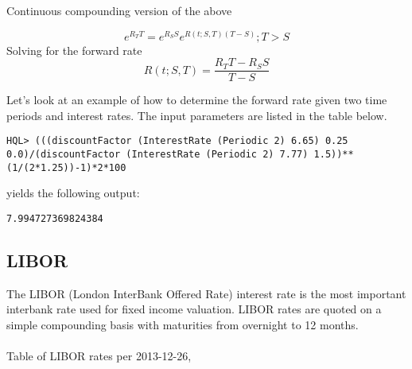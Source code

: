 \documentclass[11pt,a4paper]{article}
\numberwithin{equation}{section}
\begin{document}
Continuous compounding version of the above

\[
e^{R_TT}=e^{R_SS}e^{R(t;S,T)(T-S)};T>S
\]
Solving for the forward rate
\[
R(t;S,T)=\frac{R_TT-R_SS}{T-S}
\]

Let's look at an example of how to determine the forward rate given two time periods and interest rates. The input parameters are listed in the table below.


\FrameSep
\begin{lstlisting}
HQL> (((discountFactor (InterestRate (Periodic 2) 6.65) 0.25 0.0)/(discountFactor (InterestRate (Periodic 2) 7.77) 1.5))**(1/(2*1.25))-1)*2*100
\end{lstlisting}
yields the following output:
\FrameSep
\begin{lstlisting}[style=Output]
7.994727369824384
\end{lstlisting}

\subsection{LIBOR}
The LIBOR (London InterBank Offered Rate) interest rate is the most important interbank rate
used for fixed income valuation. LIBOR rates are quoted on a simple compounding basis with maturities
from overnight to 12 months.
\\
\\
Table of LIBOR rates per 2013-12-26,



\end{document}
